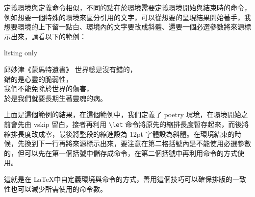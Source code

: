 定義環境與定義命令相似，不同的點在於環境需要定義環境開始與結束時的命令，例如想要一個特殊的環境來區分引用的文字，可以從想要的呈現結果開始著手，我想要環境的上下留一點白、環境內的文字要改成斜體、還要一個必選參數將來源標示出來，請看以下的範例：

\begin{tcblisting}{listing only}
\newenvironment{poetry}[1]{%
\newcommand{\poetryfer}{#1}
\vskip6pt plus 2pt minus 2pt
\let\oldparindent\parindent
\setlength{\parindent}{0pt}
\setlength{\leftskip}{12pt}\itshape}{
\\ －\poetryfer 
\vskip6pt plus 2pt minus 2pt
\setlength{\parindent}{\oldparindent}
}
\end{tcblisting}

\begin{poetry}{邱妙津《蒙馬特遺書》}
世界總是沒有錯的，\\
錯的是心靈的脆弱性，\\
我們不能免除於世界的傷害，\\
於是我們就要長期生著靈魂的病。
\end{poetry}

上面是這個範例的結果，在這個範例中，我們定義了 poetry 環境，在環境開始之前會先由 vskip 留白，接者再利用 \verb|\let| 命令將原先的縮排長度暫存起來，而後將縮排長度改成零，最後將整段的縮進設為 12pt 字體設為斜體。在環境結束的時候，先換到下一行再將來源標示出來，要注意在第二格括號內是不能使用必選參數的，但可以先在第一個括號中儲存成命令，在第二個括號中再利用命令的方式使用。

這就是在 \LaTeX 中自定義環境與命令的方式，善用這個技巧可以確保排版的一致性也可以減少所需使用的命令數。